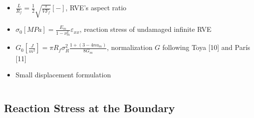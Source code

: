 \documentclass[first,firstsupp,lastsupp,last,hyperref,table]{ETHclass}
\begin{document}
\begin{frame}
\begin{columns}
\begin{column}{0.4\textwidth}
\begin{itemize}[label=]
\item $\frac{L}{R_{f}}=\frac{1}{2}\sqrt{\frac{\pi}{VF_{f}}}\left[-\right]$, RVE's aspect ratio\\[5pt]
\item $\sigma_{0}\left[MPa\right]=\frac{E_{m}}{1-\nu_{m}^{2}}\varepsilon_{xx}$, reaction stress of undamaged infinite RVE\\[5pt]
\item $G_{0}\left[\frac{J}{m^{2}}\right]=\pi R_{f}\sigma_{R}^{2}\frac{1+\left(3-4 nu_{m}\right)}{8 G_{m}}$, normalization $G$ following Toya [10] and Par\'is [11]\\[5pt]
\item Small displacement formulation
\end{itemize}
\end{column}
\end{columns}
\end{frame}

\subsection{Reaction Stress at the Boundary}
\end{document}
